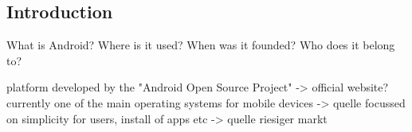\subsection{Introduction} \label{subsection:android-introduction}
What is Android? Where is it used? When was it founded? Who does it belong to?\newline


platform developed by the "Android Open Source Project" -> official website?\newline
currently one of the main operating systems for mobile devices -> quelle\newline
focussed on simplicity for users, install of apps etc -> quelle\newline
riesiger markt\newline
